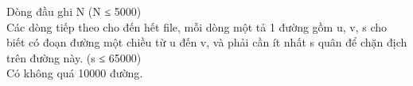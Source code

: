 Dòng đầu ghi N (N ≤ 5000)   
\\   Các dòng tiếp theo cho đến hết file, mỗi dòng một tả 1 đường gồm u, v, s cho biết có đoạn đường một chiều từ u đến v, và phải cần ít nhất s quân để chặn địch trên đường này. (s ≤ 65000)   
\\   Có không quá 10000 đường.  

\